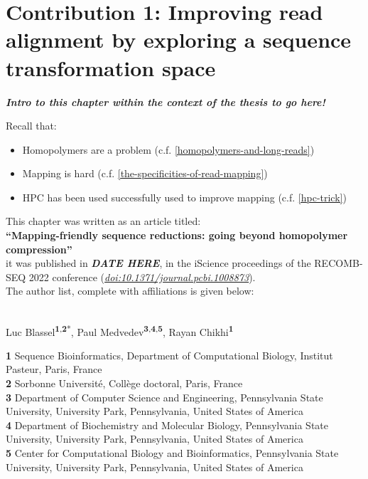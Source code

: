 \documentclass[
  11pt,
  twoside]{scrbook}
\begin{document}
\hypertarget{HPC-paper}{%
\chapter{Contribution 1: Improving read alignment by exploring a sequence transformation space}\label{HPC-paper}}

\textbf{\emph{Intro to this chapter within the context of the thesis to go here!}}

Recall that:

\begin{itemize}
\item
  Homopolymers are a problem (c.f. \ref{homopolymers-and-long-reads})
\item
  Mapping is hard (c.f. \ref{the-specificities-of-read-mapping})
\item
  HPC has been used successfully used to improve mapping (c.f. \ref{hpc-trick})
\end{itemize}

This chapter was written as an article titled:\\
\textbf{``Mapping-friendly sequence reductions: going beyond homopolymer compression''}\\
it was published in \textbf{\emph{DATE HERE}}, in the iScience proceedings of the RECOMB-SEQ 2022
conference (\href{https://doi.org/10.1371/journal.pcbi.1008873}{\emph{doi:10.1371/journal.pcbi.1008873}}).\\
The author list, complete with affiliations is given below:\\
\strut \\

Luc Blassel\textsuperscript{\textbf{1},\textbf{2}*}, Paul Medvedev\textsuperscript{\textbf{3},\textbf{4},\textbf{5}}, Rayan
Chikhi\textsuperscript{\textbf{1}}

\textbf{1} Sequence Bioinformatics, Department of Computational Biology, Institut
Pasteur, Paris, France\\
\textbf{2} Sorbonne Université, Collège doctoral, Paris, France\\
\textbf{3} Department of Computer Science and Engineering, Pennsylvania State
University, University Park, Pennsylvania, United States of America\\
\textbf{4} Department of Biochemistry and Molecular Biology, Pennsylvania State
University, University Park, Pennsylvania, United States of America\\
\textbf{5} Center for Computational Biology and Bioinformatics, Pennsylvania State
University, University Park, Pennsylvania, United States of America\\
\strut \\
\end{document}
